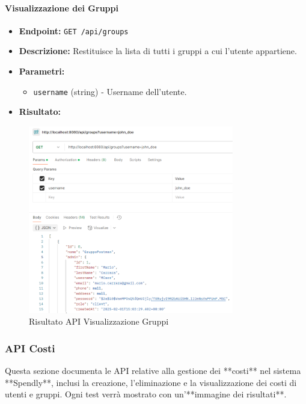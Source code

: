 \paragraph{Visualizzazione dei Gruppi}
\begin{itemize}
    \item \textbf{Endpoint:} \texttt{GET /api/groups}
    \item \textbf{Descrizione:} Restituisce la lista di tutti i gruppi a cui l'utente appartiene.
    \item \textbf{Parametri:}
    \begin{itemize}
        \item \texttt{username} (string) - Username dell'utente.
    \end{itemize}
    \item \textbf{Risultato:}
\end{itemize}
\begin{figure}[H]
    \centering
    \includegraphics[width=0.8\textwidth]{images/GetAPI.png}
    \caption{Risultato API Visualizzazione Gruppi}
    \label{fig:api_view_groups}
\end{figure}

\newpage
\subsubsection{API Costi}

Questa sezione documenta le API relative alla gestione dei **costi** nel sistema **Spendly**, inclusi la creazione, l'eliminazione e la visualizzazione dei costi di utenti e gruppi. Ogni test verrà mostrato con un'**immagine dei risultati**.

